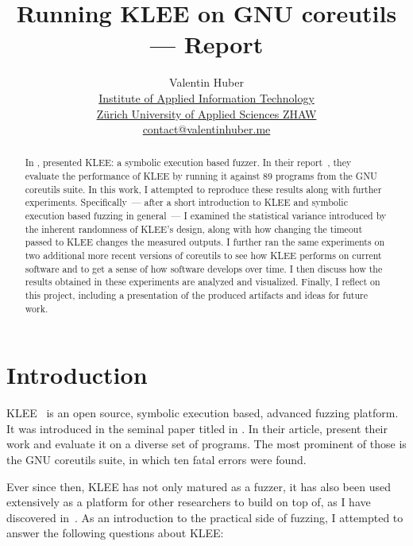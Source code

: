 \documentclass{article}
\title{%
    \vspace{50px}%
    \Huge Running KLEE on GNU coreutils\break%
    —\break%
    Report%
    \vspace{250px}%
}
\author{%
    \large Valentin Huber\vspace{5px}\\%
    \normalsize\href{https://www.zhaw.ch/en/engineering/institutes-centres/init/}{Institute of Applied Information Technology}\\%
    \normalsize\href{https://www.zhaw.ch/en}{Zürich University of Applied Sciences ZHAW}\\%
    \normalsize\href{mailto://contact@valentinhuber.me}{contact@valentinhuber.me}%
    \vspace{50px}
}
\let\savedCite=\cite
\renewcommand{\cite}{\unskip~\savedCite}
\begin{document}
\maketitle

\clearpage\newpage
\begin{center}
    \begin{minipage}{0.8\textwidth}
        \vspace{70px}
        \begin{abstract}
            In \citeyear{KLEE}, \citeauthor{KLEE} presented KLEE: a symbolic execution based fuzzer. In their report\cite{KLEE}, they evaluate the performance of KLEE by running it against 89 programs from the GNU coreutils suite. In this work, I attempted to reproduce these results along with further experiments. Specifically~— after a short introduction to KLEE and symbolic execution based fuzzing in general~— I examined the statistical variance introduced by the inherent randomness of KLEE's design, along with how changing the timeout passed to KLEE changes the measured outputs. I further ran the same experiments on two additional more recent versions of coreutils to see how KLEE performs on current software and to get a sense of how software develops over time. I then discuss how the results obtained in these experiments are analyzed and visualized. Finally, I reflect on this project, including a presentation of the produced artifacts and ideas for future work.
        \end{abstract}
    \end{minipage}
\end{center}

\clearpage\newpage
\tableofcontents
\clearpage\newpage
{}

\section{Introduction}
\label{Introduction}
KLEE\cite{KLEEWebsite} is an open source, symbolic execution based, advanced fuzzing platform. It was introduced in the seminal paper titled  in \citeyear{KLEE}. In their article, \citeauthor{KLEE} present their work and evaluate it on a diverse set of programs. The most prominent of those is the GNU coreutils suite, in which ten fatal errors were found.

Ever since then, KLEE has not only matured as a fuzzer, it has also been used extensively as a platform for other researchers to build on top of, as I have discovered in\cite{EVA}. As an introduction to the practical side of fuzzing, I attempted to answer the following questions about KLEE:
\end{document}
